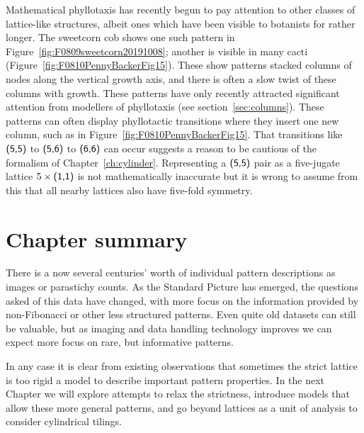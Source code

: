 Mathematical phyllotaxis has recently begun to pay attention to other classes of lattice-like structures, albeit ones which have been visible to botanists for rather longer.
  The  sweetcorn cob  shows one such pattern in Figure~\ref{fig:F0809sweetcorn20191008}; another is visible in many cacti (Figure~\ref{fig:F0810PennyBackerFig15}). These show patterns stacked columns of nodes along the vertical growth axis, and there is often a slow twist of these columns with growth. These patterns have only recently attracted significant attention from
  modellers of phyllotaxis (see section~\ref{sec:columns}). These patterns can often display phyllotactic transitions where they insert one new column, such as in Figure~\ref{fig:F0810PennyBackerFig15}.
  That transitions like  $\textsf{(5,5)}$ to $\textsf{(5,6)}$ to $\textsf{(6,6)}$ can occur suggests a reason to be cautious of  the formalism of Chapter~\ref{ch:cylinder}. Representing a $\textsf{(5,5)}$ pair as a five-jugate lattice $5\times\textsf{(1,1)}$ is not mathematically inaccurate but it is wrong to assume from this that all nearby lattices also have five-fold symmetry. 
  
  
  
  \section{Chapter summary}
  There is a now several centuries' worth of individual pattern descriptions as images or parastichy counts. As the Standard Picture has emerged, the questions asked of this data have changed, with more focus on the information provided by non-Fibonacci or other less structured patterns. Even quite old datasets can still be valuable, but as imaging and data handling technology improves we can expect more focus on rare, but informative patterns. 
  
  In any case it is clear from existing observations that sometimes the strict lattice is too rigid a model to describe important pattern properties. In the next Chapter we will explore attempts to relax the strictness, introduce models that allow these more general patterns, and 
  go beyond lattices as a unit of analysis to consider cylindrical tilings. 

